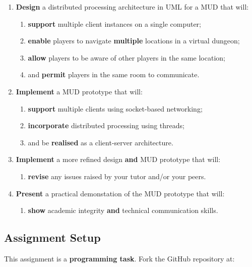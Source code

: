 \documentclass{../../../fal_assignment}
\begin{document}
\begin{enumerate}[label=(\Alph*)]
    \item \textbf{Design} a distributed processing architecture in UML for a MUD that will:
    	\begin{enumerate}[label=\roman*.]
    		\item \textbf{support} multiple client instances on a single computer;
    		\item \textbf{enable} players to navigate \textbf{multiple} locations in a virtual dungeon;
    		\item \textbf{allow} players to be aware of other players in the same location;
    		\item and \textbf{permit} players in the same room to communicate.
	\end{enumerate}
    \item \textbf{Implement} a MUD prototype that will:
    	\begin{enumerate}[label=\roman*.]
    		\item \textbf{support} multiple clients using socket-based networking;
    		\item \textbf{incorporate} distributed processing using threads;
     		\item and be \textbf{realised} as a client-server architecture.
	\end{enumerate}
    \item \textbf{Implement} a more refined design \textbf{and} MUD prototype that will:
    	\begin{enumerate}[label=\roman*.]
    		\item \textbf{revise} any issues raised by your tutor and/or your peers.
	\end{enumerate}
    \item \textbf{Present} a practical demonstation of the MUD prototype that will:
    	\begin{enumerate}[label=\roman*.]
    		\item \textbf{show} academic integrity \textbf{and} technical communication skills.
	\end{enumerate}
\end{enumerate}

\subsection*{Assignment Setup}

This assignment is a \textbf{programming task}. Fork the GitHub repository at:
\end{document}
